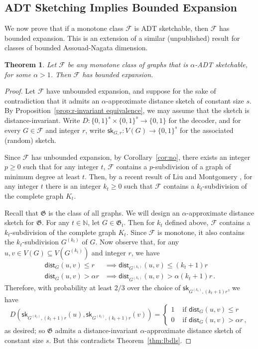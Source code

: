 \documentclass[11pt]{article}
\newtheorem{thm}{Theorem}[section]
\theoremstyle{definition}
\newcommand{\zo}{\{0,1\}}
\newcommand{\sk}{\mathsf{sk}}
\renewcommand{\leq}{\leqslant}
\renewcommand{\geq}{\geqslant}
\def\F {{\mathcal F}}
\def\fG{{\mathfrak G}}
\def\bN{{\mathbb N}}
\def\sk {\mathsf{sk}}
\newcommand{\dist}{\mathsf{dist}}
\begin{document}
\subsection{ADT Sketching Implies Bounded Expansion}

We now prove that if a monotone class $\mathcal{F}$ is ADT sketchable, then $\mathcal{F}$ has
bounded expansion. This is an extension of a similar (unpublished) result for classes of bounded
Assouad-Nagata dimension.

\begin{thm}\label{thm:weakwood}
Let $\F$ be any monotone class of graphs that is $\alpha$-ADT sketchable, for some $\alpha > 1$.
Then $\F$ has bounded expansion.
\end{thm}

\begin{proof}
Let $\mathcal F$ have unbounded expansion, and suppose for the sake of contradiction that it admits
an $\alpha$-approximate distance sketch of constant size $s$.  By Proposition~\ref{prop:r-invariant
equivalence}, we may assume that the sketch is distance-invariant.  Write $D : \zo^s \times \zo^s
\to \zo$ for the decoder, and for every $G \in \mathcal F$ and integer $r$, write $\sk_{G,r} : V(G)
\to \zo^s$ for the associated (random) sketch.

Since $\mathcal F$ has unbounded expansion, by Corollary~\ref{cor:no}, there exists an integer $p
\geq 0$ such that for any integer $t$, $\mathcal F$ contains a $p$-subdivision of a graph of minimum
degree at least $t$. Then, by a recent result of Liu and Montgomery \cite{LM20}, for any integer $t$
there is an integer $k_t \geq 0$ such that $\mathcal F$ contains a $k_t$-subdivision of the complete
graph $K_t$.

Recall that $\fG$ is the class of all graphs. We will design an $\alpha$-approximate distance sketch
for $\fG$. For any $t \in \bN$, let $G \in \fG_t$. Then for $k_t$ defined above,
$\mathcal F$ contains a $k_t$-subdivision of the complete graph $K_t$. Since $\mathcal F$ is
monotone, it also contains the $k_t$-subdivision $G^{(k_t)}$ of $G$. Now observe that, for any $u, v
\in V(G) \subseteq V(G^{(k_t)})$ and integer $r$, we have
\begin{align*}
\dist_G(u,v) \leq r &\implies \dist_{G^{(k_t)}}(u, v) \leq (k_t+1)r \\
\dist_G(u,v) > \alpha r &\implies \dist_{G^{(k_t)}}(u, v) > \alpha (k_t+1)r \,.
\end{align*}
Therefore, with probability at least $2/3$ over the choice of $\sk_{G^{(k_t)}, (k_t+1)r}$, we have
\[
  D(\sk_{G^{(k_t)}, (k_t+1)r}(u), \sk_{G^{(k_t)}, (k_t+1)r}(v)) = \begin{cases}
    1 &\text{ if } \dist_G(u,v) \leq r \\
    0 &\text{ if } \dist_G(u,v) > \alpha r \,,
  \end{cases}
\]
as desired; so $\fG$ admits a distance-invariant $\alpha$-approximate distance sketch of
constant size $s$. But this contradicts Theorem~\ref{thm:lbdls}.
\end{proof}
\end{document}
